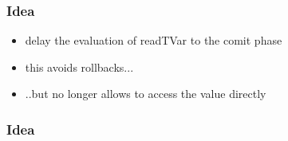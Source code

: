 \documentclass{beamer}
\begin{document}
  \begin{frame}
   \frametitle{Idea}
      \begin{itemize}
       \item delay the evaluation of readTVar to the comit phase 
       \item this avoids rollbacks...
       \item ..but no longer allows to access the value directly
      \end{itemize}
  \end{frame}

  \begin{frame}
   \frametitle{Idea}
      
  \end{frame}

  
  
  
\end{document}
